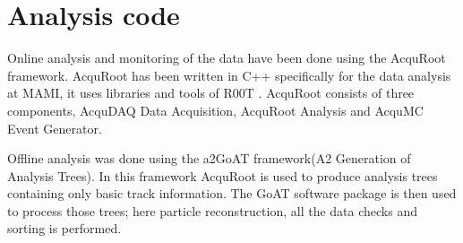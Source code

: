 \section{Analysis code}

\indent Online analysis and monitoring of the data have been done using the AcquRoot framework. AcquRoot has been written in C++ specifically for the data analysis at MAMI, it uses libraries and tools of R00T \cite{john, root}. AcquRoot consists of three components, AcquDAQ Data Acquisition, AcquRoot Analysis and AcquMC Event Generator.

\indent Offline analysis was done using the a2GoAT framework(A2 Generation of Analysis Trees). In this framework AcquRoot is used to produce analysis trees containing only basic track information. The GoAT software package is then used to process those trees; here particle reconstruction, all the data checks and sorting is performed.
